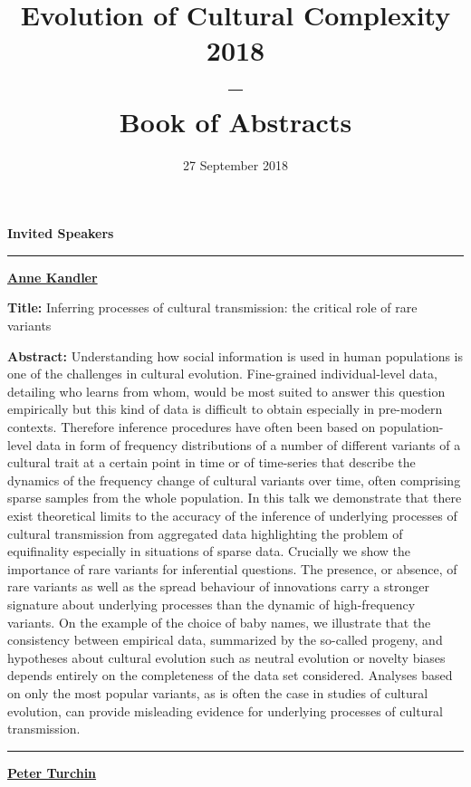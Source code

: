 \documentclass[]{article}
\date{}
\title{Evolution of Cultural Complexity 2018\\--\\Book of Abstracts}
\author{27 September 2018}
\begin{document}
\maketitle

\vspace{1cm}
\begin{center}
    \Large
    {\bf Invited Speakers\\}
    \rule{4cm}{.4pt}
\end{center}


{\bf { \href{../speakers\#ak}{Anne
Kandler} }}

\textbf{Title:} Inferring processes of cultural transmission: the
critical role of rare variants

\textbf{Abstract:} Understanding how social information is used in human
populations is one of the challenges in cultural evolution. Fine-grained
individual-level data, detailing who learns from whom, would be most
suited to answer this question empirically but this kind of data is
difficult to obtain especially in pre-modern contexts. Therefore
inference procedures have often been based on population-level data in
form of frequency distributions of a number of different variants of a
cultural trait at a certain point in time or of time-series that
describe the dynamics of the frequency change of cultural variants over
time, often comprising sparse samples from the whole population. In this
talk we demonstrate that there exist theoretical limits to the accuracy
of the inference of underlying processes of cultural transmission from
aggregated data highlighting the problem of equifinality especially in
situations of sparse data. Crucially we show the importance of rare
variants for inferential questions. The presence, or absence, of rare
variants as well as the spread behaviour of innovations carry a stronger
signature about underlying processes than the dynamic of high-frequency
variants. On the example of the choice of baby names, we illustrate that
the consistency between empirical data, summarized by the so-called
progeny, and hypotheses about cultural evolution such as neutral
evolution or novelty biases depends entirely on the completeness of the
data set considered. Analyses based on only the most popular variants,
as is often the case in studies of cultural evolution, can provide
misleading evidence for underlying processes of cultural transmission.

\rule{4cm}{.4pt}

{\bf { \href{../speakers\#ak}{Peter Turchin} }}
\end{document}
